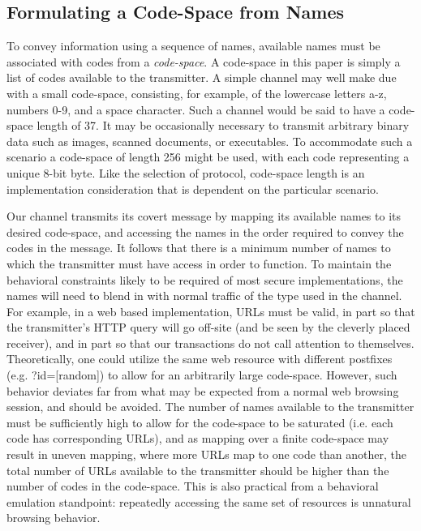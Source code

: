 \documentclass[10pt, conference]{IEEEtran}
\begin{document}
\subsection{Formulating a Code-Space from Names}
To convey information using a sequence of names, available names must be associated with codes from a {\em code-space}.  A code-space in this paper is simply a list of codes available to the transmitter.  A simple channel may well make due with a small code-space, consisting, for example, of the lowercase letters a-z, numbers 0-9, and a space character.  Such a channel would be said to have a code-space length of 37.  It may be occasionally necessary to transmit arbitrary binary data such as images, scanned documents, or executables.  To accommodate such a scenario a code-space of length 256 might be used, with each code representing a unique 8-bit byte.  Like the selection of protocol, code-space length is an implementation consideration that is dependent on the particular scenario.

Our channel transmits its covert message by mapping its available names to its desired code-space, and accessing the names in the order required to convey the codes in the message.  It follows that there is a minimum number of names to which the transmitter must have access in order to function.  To maintain the behavioral constraints likely to be required of most secure implementations, the names will need to blend in with normal traffic of the type used in the channel.  For example, in a web based implementation, URLs must be valid, in part so that the transmitter's HTTP query will go off-site (and be seen by the cleverly placed receiver), and in part so that our transactions do not call attention to themselves.  Theoretically, one could utilize the same web resource with different postfixes (e.g. ?id=[random]) to allow for an arbitrarily large code-space.  However, such behavior deviates far from what may be expected from a normal web browsing session, and should be avoided.  The number of names available to the transmitter must be sufficiently high to allow for the code-space to be saturated (i.e. each code has corresponding URLs), and as mapping over a finite code-space may result in uneven mapping, where more URLs map to one code than another, the total number of URLs available to the transmitter should be higher than the number of codes in the code-space.  This is also practical from a behavioral emulation standpoint: repeatedly accessing the same set of resources is unnatural browsing behavior.
\end{document}
